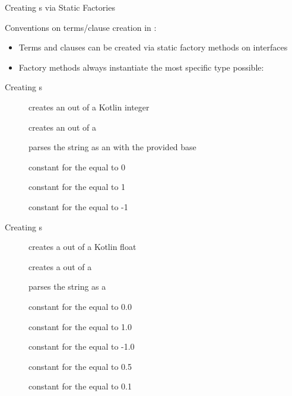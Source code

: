 \documentclass[handout]{beamer}
\begin{document}
\begin{frame}[allowframebreaks]{Creating s via Static Factories}

    Conventions on terms/clause creation in \twopkt:
    \bigskip
    \begin{itemize}
        \item Terms and clauses can be created via \alert{static factory methods} on interfaces

        \framebreak

        \item Factory methods always instantiate the most specific type possible:
    \end{itemize}

    \framebreak

    \begin{block}{Creating s}
        \begin{description}
            \item[] creates an  out of a Kotlin integer
            \item[] creates an  out of a 
            \item[] parses the string as an  with the provided base
            \item[] constant for the  equal to 0
            \item[] constant for the  equal to 1
            \item[] constant for the  equal to -1
        \end{description}
    \end{block}

    \framebreak

    \begin{block}{Creating s}
        \begin{description}
            \item[] creates a  out of a Kotlin float
            \item[] creates a  out of a 
            \item[] parses the string as a 
            \item[] constant for the  equal to 0.0
            \item[] constant for the  equal to 1.0
            \item[] constant for the  equal to -1.0
            \item[] constant for the  equal to 0.5
            \item[] constant for the  equal to 0.1
        \end{description}
    \end{block}


\end{frame}
\end{document}
